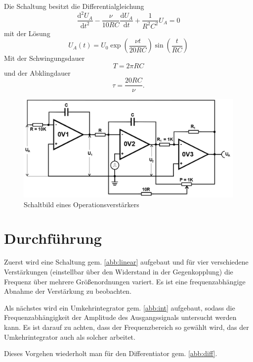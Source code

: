 Die Schaltung besitzt die Differentialgleichung
\begin{equation}
\frac{\text{d}^2 U_A}{\text{d}t^2} - \frac{\nu}{10RC} \frac{\text{d} U_A}{\text{d}t} + \frac{1}{R^2 C^2} U_A = 0
\end{equation}
mit der Lösung
\begin{equation}
U_A(t) = U_0 \exp(\frac{\nu t}{20 RC}) \sin(\frac{t}{RC})
\end{equation}
Mit der Schwingungsdauer
\begin{equation}
T = 2\pi RC
\end{equation}
und der Abklingdauer
\begin{equation}
\tau = \frac{20 RC}{\nu}.
\end{equation}

\begin{figure}
 	\centering
 	\includegraphics[width=\textwidth]{img/sin.png}
 	\caption{Schaltbild eines Operationsverstärkers}
 	\label{abb:sig2}
\end{figure}

\section{Durchf{\"u}hrung}
Zuerst wird eine Schaltung gem. \ref{abb:linear} aufgebaut und für vier verschiedene Verstärkungen (einstellbar über den Widerstand in der Gegenkopplung)
die Frequenz über mehrere Größenordnungen variert. Es ist eine frequenzabhängige Abnahme der Verstärkung zu beobachten.

Als nächstes wird ein Umkehrintegrator gem. \ref{abb:int} aufgebaut, sodass die 
Frequenzabhängigkeit der Amplitude des Ausgangssignals untersucht werden kann. Es 
ist darauf zu achten, dass der Frequenzbereich so gewählt wird, das der Umkehrintegrator
auch als solcher arbeitet.

Dieses Vorgehen wiederholt man für den Differentiator gem. \ref{abb:diff}.

